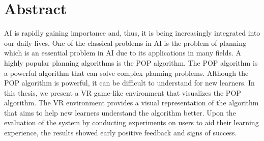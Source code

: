 \chapter*{Abstract}
\label{chap:abstract}

\ac{AI} is rapidly gaining importance and, thus, it is being increasingly integrated into our daily lives. One of the classical problems in \ac{AI} is the problem of planning which is an essential problem in \ac{AI} due to its applications in many fields. A highly popular planning algorithms is the \ac{POP} algorithm. The \ac{POP} algorithm is a powerful algorithm that can solve complex planning problems. Although the \ac{POP} algorithm is powerful, it can be difficult to understand for new learners. In this thesis, we present a \ac{VR} game-like environment that visualizes the \ac{POP} algorithm. The \ac{VR} environment provides a visual representation of the algorithm that aims to help new learners understand the algorithm better. Upon the evaluation of the system by conducting experiments on users to aid their learning experience, the results showed early positive feedback and signs of success.
